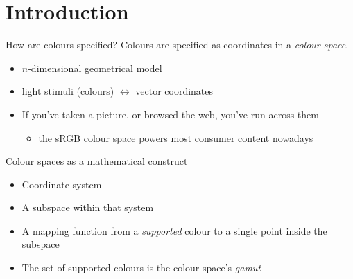 \documentclass[aspectratio=169,handout]{fireshonks}
\begin{document}
\section{Introduction}
\begin{frame}{How are colours specified?}
    Colours are specified as coordinates in a \emph{colour space}.
    \begin{itemize}[<+(1)->]
        \item $n$-dimensional geometrical model
        \item light stimuli (colours) $\leftrightarrow$ vector coordinates
        \item If you've taken a picture, or browsed the web, you've run across them
              \begin{itemize}
                  \item the sRGB colour space powers most consumer content nowadays
              \end{itemize}
    \end{itemize}
\end{frame}
\begin{frame}{Colour spaces as a mathematical construct}
    \begin{itemize}
        \item Coordinate system
        \item A subspace within that system
        \item A mapping function from a \emph{supported} colour to a single point inside the subspace
        \item The set of supported colours is the colour space's \emph{gamut}
    \end{itemize}
\end{frame}
\end{document}
